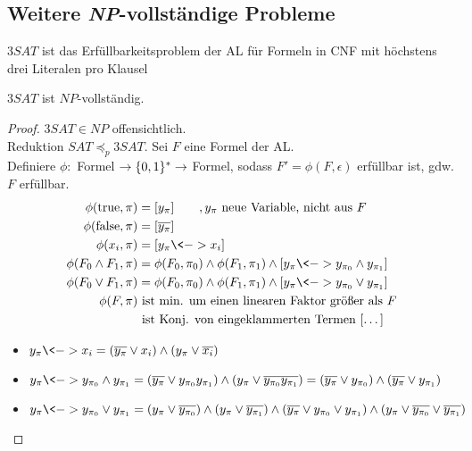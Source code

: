 \subsection{Weitere \textit{NP}-vollständige Probleme}
\begin{Def}[name={[$3SAT$]}]
	$3SAT$ ist das Erfüllbarkeitsproblem der \ac{AL} für Formeln in \ac{CNF} mit höchstens drei Literalen pro Klausel
\end{Def}
\begin{Satz}[name={[$3SAT$ ist $NP$-vollständig]}]
	$3SAT$ ist $NP$-vollständig.
\end{Satz}
\begin{proof}
	$3SAT \in NP$ offensichtlich.\\
	Reduktion $SAT \preceq_p 3SAT$. Sei $F$ eine Formel der \ac{AL}.\\
	Definiere $\phi: $ Formel $\->\{0,1\}^*\->$ Formel, sodass $F' = \phi(F,\epsilon)$ erfüllbar ist, gdw. $F$ erfüllbar.
	\begin{align*}
		\phi(\text{true},\pi) &= [y_\pi] \qquad, y_\pi\text{ neue Variable, nicht aus }F\\
		\phi(\text{false},\pi) &= [\overline{y_\pi}]\\
		\phi(x_i,\pi) &= [y_\pi \<-> x_i]\\
		\phi(F_0\land F_1,\pi) &= \phi(F_0,\pi_0)\land\phi(F_1,\pi_1)\land [y_\pi\<->y_{\pi_0}\land y_{\pi_1}]\\
		\phi(F_0\lor F_1,\pi) &= \phi(F_0,\pi_0)\land\phi(F_1,\pi_1)\land [y_\pi\<->y_{\pi_0}\lor y_{\pi_1}]\\
		\phi(F,\pi) &\text{ ist min. um einen linearen Faktor größer als }F\\
		&\text{ ist Konj. von eingeklammerten Termen }[\dots]
	\end{align*}
	\begin{itemize}
	\item $y_\pi \<-> x_i = (\overline{y_\pi}\lor x_i)\land(y_\pi\lor \overline{x_i})$
	\item $y_\pi\<-> y_{\pi_0}\land y_{\pi_1}
		= (\overline{y_\pi}\lor y_{\pi_0}y_{\pi_1})
		\land (y_\pi\lor \overline{y_{\pi_0}y_{\pi_1}})
		= (\overline{y_\pi}\lor y_{\pi_0})
		\land (\overline{y_\pi}\lor y_{\pi_1})$
	\item $y_\pi\<-> y_{\pi_0}\lor y_{\pi_1}
		= (y_\pi\lor \overline{y_{\pi_0}})
		\land (y_\pi\lor\overline{y_{\pi_1}})
		\land (\overline{y_\pi}\lor y_{\pi_0}\lor y_{\pi_1})
		\land (y_\pi \lor \overline{y_{\pi_0}} \lor \overline{y_{\pi_1}})$
	\end{itemize}
\end{proof}
